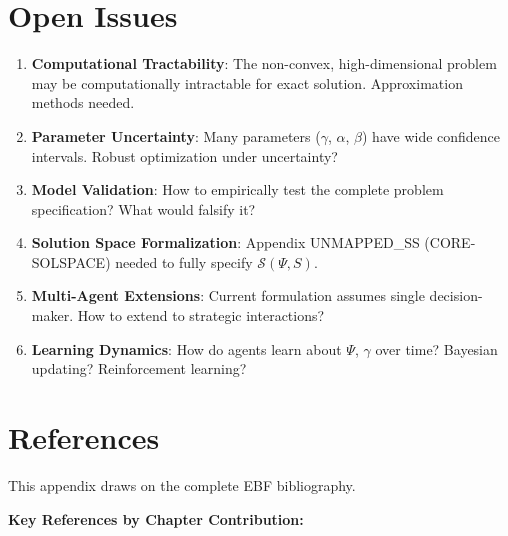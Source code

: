 \section{Open Issues}
\label{sec:mp-open-issues}

\begin{enumerate}
\item \textbf{Computational Tractability}: The non-convex, high-dimensional
      problem may be computationally intractable for exact solution.
      Approximation methods needed.

\item \textbf{Parameter Uncertainty}: Many parameters ($\gamma$, $\alpha$, $\beta$)
      have wide confidence intervals. Robust optimization under uncertainty?

\item \textbf{Model Validation}: How to empirically test the complete problem
      specification? What would falsify it?

\item \textbf{Solution Space Formalization}: Appendix UNMAPPED_SS (CORE-SOLSPACE)
      needed to fully specify $\mathcal{S}(\Psi, S)$.

\item \textbf{Multi-Agent Extensions}: Current formulation assumes single
      decision-maker. How to extend to strategic interactions?

\item \textbf{Learning Dynamics}: How do agents learn about $\Psi$, $\gamma$
      over time? Bayesian updating? Reinforcement learning?
\end{enumerate}

\section{References}
\label{sec:mp-references}

This appendix draws on the complete EBF bibliography.

\nocite{bcm_master}

\textbf{Key References by Chapter Contribution:}

